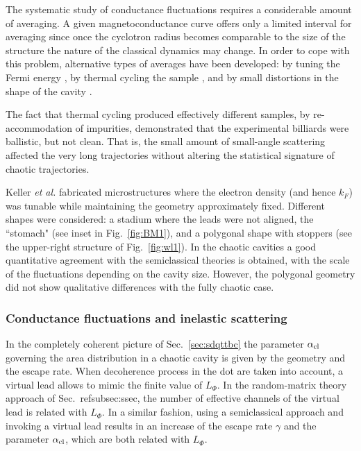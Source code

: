 \documentclass[a4paper,10pt]{article}
\newcommand{\kf}{k_{\scriptscriptstyle F}}
\newcommand{\nin}{\noindent}
\newcommand{\alc}{\alpha_{\rm cl}}
\begin{document}
\nin The systematic study of conductance fluctuations requires a considerable amount of averaging. A given magnetoconductance curve offers only a limited interval for averaging since once the cyclotron radius becomes comparable to the size of the structure the nature of the classical dynamics may change. In order to cope with this problem, alternative types of averages have been developed: by tuning the Fermi energy \cite{Kel94,zozou97}, by thermal cycling the sample \cite{berry94,bird}, and by small distortions in the shape of the cavity \cite{marcusgroup2}.

\nin The fact that thermal cycling produced effectively different samples, by re-accommodation of impurities, demonstrated that the experimental billiards were ballistic, but not clean. That is, the small amount of small-angle scattering affected the very long trajectories without altering the statistical signature of chaotic trajectories. 

\nin Keller {\em et al.} \cite{Kel94} fabricated microstructures where the electron density (and hence $\kf$) was tunable while maintaining the geometry approximately fixed. Different shapes were considered: a stadium where the leads were not aligned, the ``stomach" (see inset in Fig.~\ref{fig:BM1}), and a polygonal shape with stoppers (see the upper-right structure of Fig.~\ref{fig:wl1}). In the chaotic cavities a good quantitative agreement with the semiclassical theories is obtained, with the scale of the fluctuations depending on the cavity size. However, the polygonal geometry did not show qualitative differences with the fully chaotic case. 

\subsubsection{Conductance fluctuations and inelastic scattering}
\label{subsec:cfis}

In the completely coherent picture of Sec.~\ref{sec:sdqttbc} the parameter $\alc$ governing the area distribution in a chaotic cavity is given by
the geometry and the escape rate. When decoherence process in the dot are 
taken into account, a virtual lead \cite{Butt86b} allows to mimic the finite value of $L_{\Phi}$. In the random-matrix theory approach of Sec.~ref{subsec:ssec}, the number of effective channels of the virtual lead is related with $L_{\Phi}$. In a similar fashion, using a semiclassical approach and invoking a virtual lead results in an increase of the escape rate $\gamma$ and the parameter $\alc$, which are both related with $L_{\Phi}$.
\end{document}
